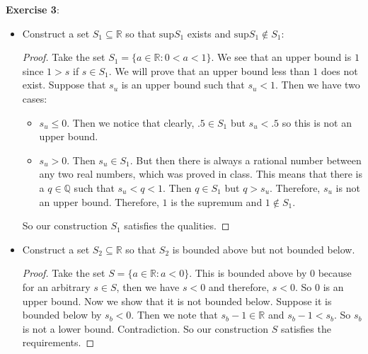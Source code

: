 \documentclass{article}
\begin{document}
\textbf{Exercise 3}: 
    \begin{itemize}
        \item Construct a set $S_{1} \subseteq  \mathbb{R}$ so that $\text{sup}S_{1}$ exists and $\text{sup}S_{1} \notin S_{1}$:
            \begin{proof}
                Take the set $S_{1} = \{a \in \mathbb{R}: 0 < a < 1\}$. We see that an upper bound is $1$ since $1 > s$ if $s \in S_{1}$. We will prove that an upper bound less than $1$ does not exist. Suppose that $s_{u}$ is an upper bound such that $s_{u} < 1$. Then we have two cases:
                    \begin{itemize}
                        \item $s_{u} \leq 0$. Then we notice that clearly, $.5 \in S_{1}$ but $s_{u} < .5$ so this is not an upper bound.

                        \item $s_{u} > 0$. Then $s_{u} \in S_{1}$. But then there is always a rational number between any two real numbers, which was proved in class. This means that there is a $q \in \mathbb{Q}$ such that $s_{u} <  q < 1$. Then $q \in S_{1}$ but $q > s_{u}$. Therefore, $s_{u}$ is not an upper bound. Therefore, $1$ is the supremum and $1 \notin S_{1}$.
                    \end{itemize}
                So our construction $S_{1}$ satisfies the qualities.
            \end{proof}

        \item Construct a set $S_{2} \subseteq \mathbb{R}$ so that $S_{2}$ is bounded above but not bounded below. 
            \begin{proof}
                Take the set $S = \{a \in \mathbb{R}: a < 0\}$. This is bounded above by $0$ because for an arbitrary $s \in S$, then we have $s < 0$ and therefore, $s < 0$. So $0$ is an upper bound. Now we show that it is not bounded below. Suppose it is bounded below by $s_{b} < 0$. Then we note that $s_{b} - 1 \in \mathbb{R}$ and $s_{b} - 1 <  s_{b}$. So $s_{b}$ is not a lower bound. Contradiction. So our construction $S$ satisfies the requirements.
            \end{proof}
    \end{itemize}
\end{document}
